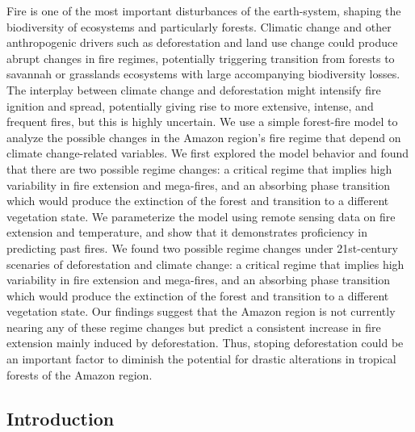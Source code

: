 \documentclass[
]{article}
\begin{document}
Fire is one of the most important disturbances of the earth-system,
shaping the biodiversity of ecosystems and particularly forests.
Climatic change and other anthropogenic drivers such as deforestation
and land use change could produce abrupt changes in fire regimes,
potentially triggering transition from forests to savannah or grasslands
ecosystems with large accompanying biodiversity losses. The interplay
between climate change and deforestation might intensify fire ignition
and spread, potentially giving rise to more extensive, intense, and
frequent fires, but this is highly uncertain. We use a simple
forest-fire model to analyze the possible changes in the Amazon region's
fire regime that depend on climate change-related variables. We first
explored the model behavior and found that there are two possible regime
changes: a critical regime that implies high variability in fire
extension and mega-fires, and an absorbing phase transition which would
produce the extinction of the forest and transition to a different
vegetation state. We parameterize the model using remote sensing data on
fire extension and temperature, and show that it demonstrates
proficiency in predicting past fires. We found two possible regime
changes under 21st-century scenaries of deforestation and climate
change: a critical regime that implies high variability in fire
extension and mega-fires, and an absorbing phase transition which would
produce the extinction of the forest and transition to a different
vegetation state. Our findings suggest that the Amazon region is not
currently nearing any of these regime changes but predict a consistent
increase in fire extension mainly induced by deforestation. Thus,
stoping deforestation could be an important factor to diminish the
potential for drastic alterations in tropical forests of the Amazon
region.

\subsection{Introduction}\label{introduction}
\end{document}
